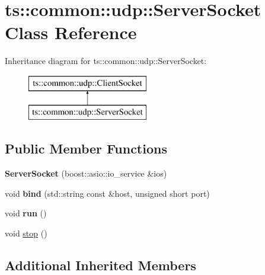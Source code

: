 \hypertarget{classts_1_1common_1_1udp_1_1_server_socket}{}\section{ts\+:\+:common\+:\+:udp\+:\+:Server\+Socket Class Reference}
\label{classts_1_1common_1_1udp_1_1_server_socket}
Inheritance diagram for ts\+:\+:common\+:\+:udp\+:\+:Server\+Socket\+:\begin{figure}[H]
\begin{center}
\leavevmode
\includegraphics[height=2.000000cm]{classts_1_1common_1_1udp_1_1_server_socket}
\end{center}
\end{figure}
\subsection*{Public Member Functions}
\begin{DoxyCompactItemize}
\item 
\mbox{\label{classts_1_1common_1_1udp_1_1_server_socket_a82b048bf21083a03578931337bd8a1d6}} 
{\bfseries Server\+Socket} (boost\+::asio\+::io\+\_\+service \&ios)
\item 
\mbox{\label{classts_1_1common_1_1udp_1_1_server_socket_a389113d153edeb689d0ce9fe66d82ae1}} 
void {\bfseries bind} (std\+::string const \&host, unsigned short port)
\item 
\mbox{\label{classts_1_1common_1_1udp_1_1_server_socket_ae720d8cf182cebf184a535fbb31c3d1c}} 
void {\bfseries run} ()
\item 
void \hyperlink{classts_1_1common_1_1udp_1_1_server_socket_a194fa6832f3ac6fa0c4b1c03abc5c8ec}{stop} ()
\end{DoxyCompactItemize}
\subsection*{Additional Inherited Members}


